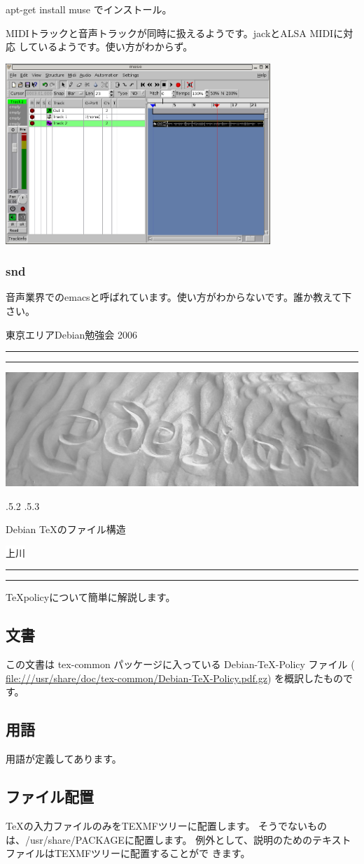 \documentclass[mingoth,a4paper]{jsarticle}
\makeatletter
\renewcommand{\section}{\@startsection{section}{1}{\z@}%
    {\Cvs \@plus.5\Cdp \@minus.2\Cdp}%
    {.5\Cvs \@plus.3\Cdp}%
    {\normalfont\Huge\headfont\raggedright\centering}} %
\newcommand{\dancersection}[2]{%
\newpage
東京エリアDebian勉強会 2006
\hrule
\vspace{0.5mm}
\hrule
\hfill{}\includegraphics[width=16cm]{image2006-natsu/guruguru-sand-light.png}\\
\vspace{-5cm}
\begin{center}
\section{#1}
\end{center}
\hfill{}\colorbox{white}{#2}\hspace{3cm}\space\\
\vspace{1cm}
\hrule
\vspace{0.5mm}
\hrule
\vspace{1cm}
}
\makeatother
\begin{document}
apt-get install muse でインストール。

MIDIトラックと音声トラックが同時に扱えるようです。jackとALSA MIDIに対応
しているようです。使い方がわからず。

\includegraphics[width=10cm]{image200602/muse.png}


\subsubsection{snd}

音声業界でのemacsと呼ばれています。使い方がわからないです。誰か教えて下
さい。

\dancersection{Debian \TeX{}のファイル構造}{上川}
\label{sec:latexdebian1}

\TeX policyについて簡単に解説します。

\subsection{文書}
この文書は tex-common パッケージに入っている Debian-\TeX-Policy ファイル ( \url{file:///usr/share/doc/tex-common/Debian-TeX-Policy.pdf.gz})
を概訳したものです。

\subsection{用語}

用語が定義してあります。

\subsection{ファイル配置}

\TeX{}の入力ファイルのみをTEXMFツリーに配置します。
そうでないものは、/usr/share/PACKAGEに配置します。
例外として、説明のためのテキストファイルはTEXMFツリーに配置することがで
きます。
\end{document}
